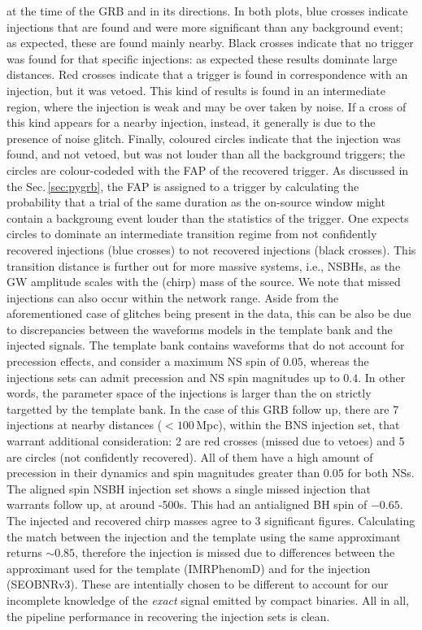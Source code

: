\documentclass[binding=0.6cm, LaM]{sapthesis}
\begin{document}
	at the time of the GRB and in its directions.
	In both plots, blue crosses indicate injections that are found 
	and were more significant than any background event;
	as expected, these are found mainly nearby.
	Black crosses indicate that no trigger was found for that specific injections: 
	as expected these results dominate large distances.
	Red crosses indicate that a trigger is found in correspondence with an injection, 			
	but it was vetoed.  
	This kind of results is found in an intermediate region, 
	where the injection is weak and may be over taken by noise.  
	If a cross of this kind appears for a nearby injection, instead, 
	it generally is due to the presence of noise glitch.
	Finally, coloured circles indicate that the injection was found, and not vetoed, 
	but was not louder than all the background triggers;  
	the circles are colour-codeded with the FAP of the recovered trigger.
	As discussed in the Sec.\,\ref{sec:pygrb}, the FAP is assigned to a trigger 
	by calculating the probability that a trial of the same duration as the on-source window 
	might contain a backgroung event louder than the statistics of the trigger.
        One expects circles to dominate an intermediate transition regime from 
	not confidently recovered injections (blue crosses) to not recovered injections (black crosses).  
	This transition distance is further out for more massive systems, i.e., NSBHs, 
	as the GW amplitude scales with the (chirp) mass of the source.
	We note that missed injections can also occur within the network range.  
	Aside from the aforementioned case of glitches being present in the data, 
	this can be also be due to discrepancies between 
	the waveforms models in the template bank and the injected signals.
	The template bank contains waveforms that do not account for precession effects, 
	and consider a maximum NS spin of $0.05$, whereas the injections sets can admit 
	precession and NS spin magnitudes up to $0.4$.  
	In other words, the parameter space of the injections is larger 
	than the on strictly targetted by the template bank.
	In the case of this GRB follow up, there are 7 injections at nearby distances ($<100\,$Mpc), 
	within the BNS injection set, that warrant additional consideration: 
        2 are red crosses (missed due to vetoes) and 5 are circles (not confidently recovered).
	All of them have a high amount of precession in their dynamics and spin magnitudes greater than $0.05$ for both NSs.
	The aligned spin NSBH injection set shows a single missed injection that warrants follow up, 
	at around -500s.
	This had an antialigned BH spin of $-0.65$. 
	The injected and recovered chirp masses agree to 3 significant figures. 
	Calculating the match between the injection and the template using the same approximant returns $\sim 0.85$, 
	therefore the injection is missed due to differences between the approximant 
	used for the template (IMRPhenomD) and for the injection (SEOBNRv3).  
	These are intentially chosen to be different to account for our incomplete knowledge 
	of the \emph{exact} signal emitted by compact binaries.
        All in all, the pipeline performance in recovering the injection sets is clean.  
	
\end{document}
